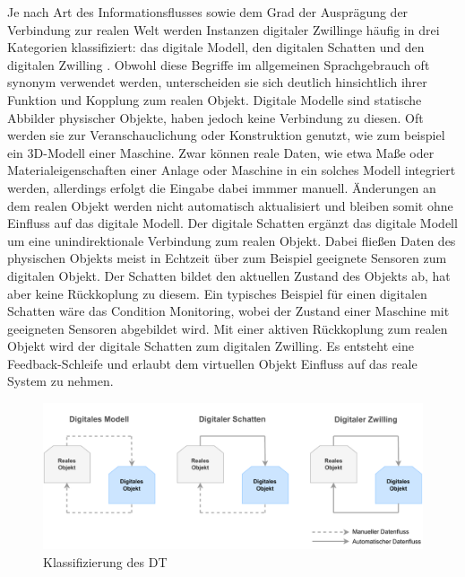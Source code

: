 Je nach Art des Informationsflusses sowie dem Grad der Ausprägung der Verbindung zur realen Welt werden Instanzen digitaler Zwillinge häufig in drei Kategorien klassifiziert: das digitale Modell, den digitalen Schatten und den digitalen Zwilling \cite{ClassificationDT}.
Obwohl diese Begriffe im allgemeinen Sprachgebrauch oft synonym verwendet werden, unterscheiden sie sich deutlich hinsichtlich ihrer Funktion und Kopplung zum realen Objekt.
Digitale Modelle sind statische Abbilder physischer Objekte, haben jedoch keine Verbindung zu diesen. 
Oft werden sie zur Veranschauclichung oder Konstruktion genutzt, wie zum beispiel ein 3D-Modell einer Maschine.
Zwar können reale Daten, wie etwa Maße oder Materialeigenschaften einer Anlage oder Maschine in ein solches Modell integriert werden, allerdings erfolgt die Eingabe dabei immmer manuell.
Änderungen an dem realen Objekt werden nicht automatisch aktualisiert und bleiben somit ohne Einfluss auf das digitale Modell.
Der digitale Schatten ergänzt das digitale Modell um eine unindirektionale Verbindung zum realen Objekt.
Dabei fließen Daten des physischen Objekts meist in Echtzeit über zum Beispiel geeignete Sensoren zum digitalen Objekt.
Der Schatten bildet den aktuellen Zustand des Objekts ab, hat aber keine Rückkoplung zu diesem.
Ein typisches Beispiel für einen digitalen Schatten wäre das Condition Monitoring, wobei der Zustand einer Maschine mit geeigneten Sensoren abgebildet wird.
Mit einer aktiven Rückkoplung zum realen Objekt wird der digitale Schatten zum digitalen Zwilling.
Es entsteht eine Feedback-Schleife und erlaubt dem virtuellen Objekt Einfluss auf das reale System zu nehmen.


\begin{figure}[htbp]
    \centering
    \includegraphics[width=1\textwidth]{Bilder/klassifizierung_DT.pdf}
    \caption{Klassifizierung des DT}
    \label{fig:klassifizierungDT}
\end{figure}

